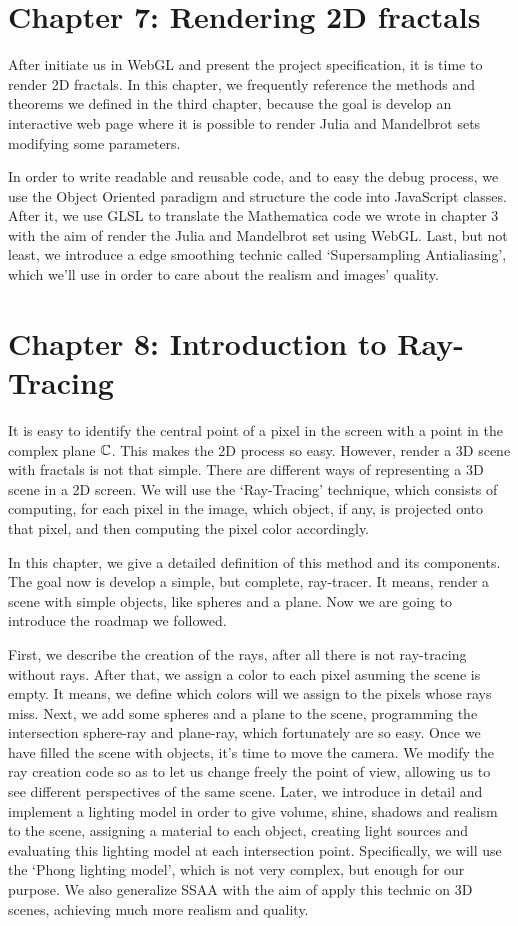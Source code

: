 \section*{Chapter 7: Rendering 2D fractals}

After initiate us in WebGL and present the project specification, it is time to render 2D fractals. In this chapter, we frequently reference the methods and theorems we defined in the third chapter, because the goal is develop an interactive web page where it is possible to render Julia and Mandelbrot sets modifying some parameters.

In order to write readable and reusable code, and to easy the debug process, we use the Object Oriented paradigm and structure the code into JavaScript classes. After it, we use GLSL to translate the Mathematica code we wrote in chapter 3 with the aim of render the Julia and Mandelbrot set using WebGL. Last, but not least, we introduce a edge smoothing technic called `Supersampling Antialiasing', which we'll use in order to care about the realism and images' quality.

\section*{Chapter 8: Introduction to Ray-Tracing}

It is easy to identify the central point of a pixel in the screen with a point in the complex plane $\mathbb{C}$. This makes the 2D process so easy. However, render a 3D scene with fractals is not that simple. There are different ways of representing a 3D scene in a 2D screen. We will use the `Ray-Tracing' technique, which consists of computing, for each pixel in the image, which object, if any, is projected onto that pixel, and then computing the pixel color accordingly.

In this chapter, we give a detailed definition of this method and its components. The goal now is develop a simple, but complete, ray-tracer. It means, render a scene with simple objects, like spheres and a plane. Now we are going to introduce the roadmap we followed.

First, we describe the creation of the rays, after all there is not ray-tracing without rays. After that, we assign a color to each pixel asuming the scene is empty. It means, we define which colors will we assign to the pixels whose rays miss. Next, we add some spheres and a plane to the scene, programming the intersection sphere-ray and plane-ray, which fortunately are so easy. Once we have filled the scene with objects, it's time to move the camera. We modify the ray creation code so as to let us change freely the point of view, allowing us to see different perspectives of the same scene. Later, we introduce in detail and implement a lighting model in order to give volume, shine, shadows and realism to the scene, assigning a material to each object, creating light sources and evaluating this lighting model at each intersection point. Specifically, we will use the `Phong lighting model', which is not very complex, but enough for our purpose. We also generalize SSAA with the aim of apply this technic on 3D scenes, achieving much more realism and quality.

